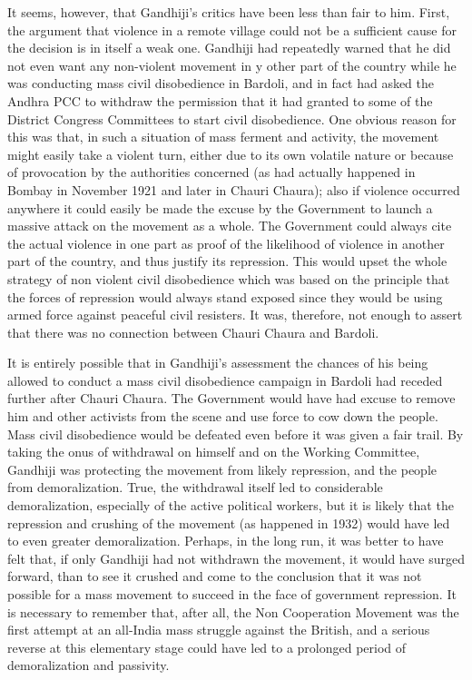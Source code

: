 \begin{multicols}{2}
It seems, however, that Gandhiji's critics have been less than fair to him. First, the argument that violence in a remote village could not be a sufficient cause for the decision is in itself a weak one. Gandhiji had repeatedly warned that he did not even want any non-violent movement in y other part of the country while he was conducting mass civil disobedience in Bardoli, and in fact had asked the Andhra PCC to withdraw the permission that it had granted to some of the District Congress Committees to start civil disobedience. One obvious reason for this was that, in such a situation of mass ferment and activity, the movement might easily take a violent turn, either due to its own volatile nature or because of provocation by the authorities concerned (as had actually happened in Bombay in November 1921 and later in Chauri Chaura); also if violence occurred anywhere it could easily be made the excuse by the Government to launch a massive attack on the movement as a whole. The Government could always cite the actual violence in one part as proof of the likelihood of violence in another part of the country, and thus justify its repression. This would upset the whole strategy of non violent civil disobedience which was based on the principle that the forces of repression would always stand exposed since they would be using armed force against peaceful civil resisters. It was, therefore, not enough to assert that there was no connection between Chauri Chaura and Bardoli. 

It is entirely possible that in Gandhiji's assessment the chances of his being allowed to conduct a mass civil disobedience campaign in Bardoli had receded further after Chauri Chaura. The Government would have had excuse to remove him and other activists from the scene and use force to cow down the people. Mass civil disobedience would be defeated even before it was given a fair trail. By taking the onus of withdrawal on himself and on the Working Committee, Gandhiji was protecting the movement from likely repression, and the people from demoralization. True, the withdrawal itself led to considerable demoralization, especially of the active political workers, but it is likely that the repression and crushing of the movement (as happened in 1932) would have led to even greater demoralization. Perhaps, in the long run, it was better to have felt that, if only Gandhiji had not withdrawn the movement, it would have surged forward, than to see it crushed and come to the conclusion that it was not possible for a mass movement to succeed in the face of government repression. It is necessary to remember that, after all, the Non Cooperation Movement was the first attempt at an all-India mass struggle against the British, and a serious reverse at this elementary stage could have led to a prolonged period of demoralization and passivity. 


\end{multicols}
